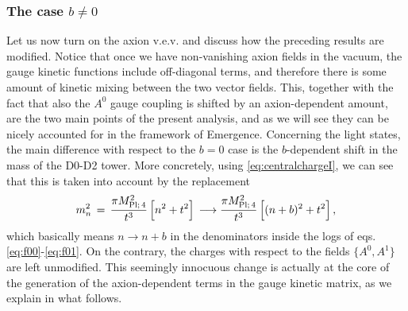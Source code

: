 \subsubsection*{The case $b\neq0$}
		
Let us now turn on the axion v.e.v. and discuss how the preceding results are modified. Notice that once we have non-vanishing axion fields in the vacuum, the gauge kinetic functions include off-diagonal terms, and therefore there is some amount of kinetic mixing between the two vector fields. This, together with the fact that also the $A^0$ gauge coupling is shifted by an axion-dependent amount, are the two main points of the present analysis, and as we will see they can be nicely accounted for in the framework of Emergence. Concerning the light states, the main difference with respect to the $b=0$ case is the $b$-dependent shift in the mass of the D0-D2 tower. More concretely, using \eqref{eq:centralchargeI}, we can see that this is taken into account by the replacement
%
\begin{equation}
\label{eq:shifbneq0}
			m_n^2\, =\, \dfrac{\pi M_{\text{Pl;}\, 4}^2}{t^3}\left[ n^2 +t^2 \right] \, \longrightarrow \dfrac{\pi M_{\text{Pl;}\, 4}^2}{t^3}\left[ (n+b)^2 +t^2 \right] ,
\end{equation}
%
which basically means $n \to n+b$ in the denominators inside the logs of eqs. \eqref{eq:f00}-\eqref{eq:f01}. On the contrary, the charges with respect to the fields $\{A^0, A^1\}$ are left unmodified. This seemingly innocuous change is actually at the core of the generation of the axion-dependent terms in the gauge kinetic matrix, as we explain in what follows. %
		
